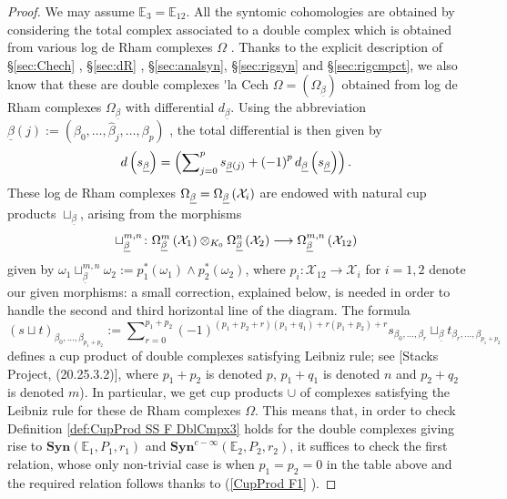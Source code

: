 \documentclass[asterisque,english]{smfart}
\begin{document}
\begin{proof}
We may assume $\mathbb{E}_{3}=\mathbb{E}_{12}$. All the syntomic
cohomologies are obtained by considering the total complex associated to a
double complex which is obtained from various log de Rham complexes $\Omega $%
. Thanks to the explicit description of \S \ref{sec:Chech} , \S \ref{sec:dR}%
, \S \ref{sec:analsyn}, \S \ref{sec:rigsyn} and \S \ref{sec:rigcmpct}, we
also know that these are double complexes \'{ }la Cech $\Omega =\left(
\Omega _{\underline{\beta }}\right) $ obtained from log de Rham complexes $%
\Omega _{\underline{\beta }}$ with differential $d_{\underline{\beta }}$.
Using the abbreviation $\underline{\beta }\left( j\right) :=\left( \beta
_{0},\ldots ,\widehat{\beta }_{j},\ldots ,\beta _{p}\right) $ , the total
differential is then given by 
\begin{equation*}
d\left( s_{\underline{\beta }}\right) =\left( \sum\nolimits_{j=0}^{p}s_{%
\underline{\beta }\left( j\right) }+\left( -1\right) ^{p}d_{\underline{\beta 
}}\left( s_{\underline{\beta }}\right) \right) \text{.}
\end{equation*}%
These log de Rham complexes $\Omega _{\underline{\beta }}=\Omega _{%
\underline{\beta }}\left( \mathcal{X}_{i}\right) $ are endowed with natural
cup products $\sqcup _{\underline{\beta }}$, arising from the morphisms 
\begin{equation*}
\sqcup _{\underline{\beta }}^{m,n}\colon \Omega _{\underline{\beta }%
}^{m}\left( \mathcal{X}_{1}\right) \otimes _{K_{0}}\Omega _{\underline{\beta 
}}^{n}\left( \mathcal{X}_{2}\right) \longrightarrow \Omega _{\underline{%
\beta }}^{m,n}\left( \mathcal{X}_{12}\right) 
\end{equation*}%
given by $\omega _{1}\sqcup _{\underline{\beta }}^{m,n}\omega
_{2}:=p_{1}^{\ast }\left( \omega _{1}\right) \wedge p_{2}^{\ast }\left(
\omega _{2}\right) $, where $p_{i}\colon \mathcal{X}_{12}\rightarrow 
\mathcal{X}_{i}$ for $i=1,2$ denote our given morphisms: a small correction,
explained below, is needed in order to handle the second and third
horizontal line of the diagram. The formula 
\begin{equation}
\left( s\sqcup t\right) _{\beta _{0},\ldots ,\beta
_{p_{1}+p_{2}}}:=\sum\nolimits_{r=0}^{p_{1}+p_{2}}\left( -1\right) ^{\left(
p_{1}+p_{2}+r\right) \left( p_{1}+q_{1}\right) +r\left( p_{1}+p_{2}\right)
+r}s_{\beta _{0},\ldots ,\beta _{r}}\sqcup _{\underline{\beta }}t_{\beta
_{r},\ldots ,\beta _{p_{1}+p_{2}}}  \label{eq:CupProd L1 FCechCup}
\end{equation}%
defines a cup product of double complexes satisfying Leibniz rule; see
[Stacks Project, (20.25.3.2)], where $p_{1}+p_{2}$ is denoted $p$, $%
p_{1}+q_{1}$ is denoted $n$ and $p_{2}+q_{2}$ is denoted $m$). In
particular, we get cup products $\cup $ of complexes satisfying the Leibniz
rule for these de Rham complexes $\Omega $. This means that, in order to
check Definition \ref{def:CupProd SS F DblCmpx3} holds for the double
complexes giving rise to $\mathbf{Syn}(\mathbb{E}_{1},P_{1},r_{1})$ and $%
\mathbf{Syn}^{c-\infty }(\mathbb{E}_{2},P_{2},r_{2})$, it suffices to check
the first relation, whose only non-trivial case is when $p_{1}=p_{2}=0$ in
the table above and the required relation follows thanks to (\ref{CupProd F1}%
).


\end{proof}
\end{document}
